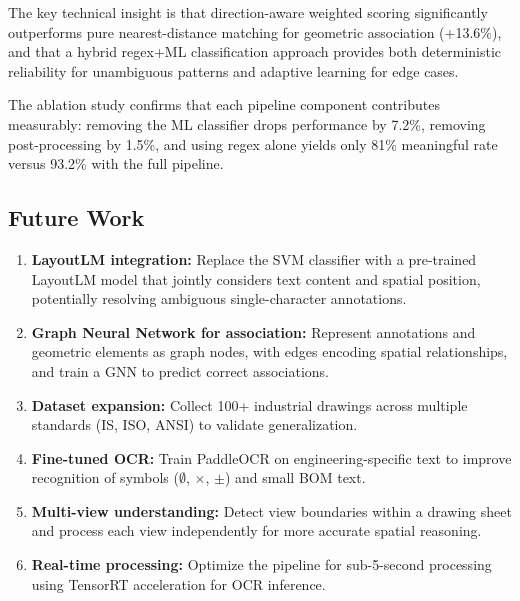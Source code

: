 \documentclass[12pt,a4paper]{article}
\begin{document}
The key technical insight is that direction-aware weighted scoring significantly outperforms pure nearest-distance matching for geometric association (+13.6\%), and that a hybrid regex+ML classification approach provides both deterministic reliability for unambiguous patterns and adaptive learning for edge cases.

The ablation study confirms that each pipeline component contributes measurably: removing the ML classifier drops performance by 7.2\%, removing post-processing by 1.5\%, and using regex alone yields only 81\% meaningful rate versus 93.2\% with the full pipeline.

\subsection{Future Work}

\begin{enumerate}
    \item \textbf{LayoutLM integration:} Replace the SVM classifier with a pre-trained LayoutLM model that jointly considers text content and spatial position, potentially resolving ambiguous single-character annotations.
    
    \item \textbf{Graph Neural Network for association:} Represent annotations and geometric elements as graph nodes, with edges encoding spatial relationships, and train a GNN to predict correct associations.
    
    \item \textbf{Dataset expansion:} Collect 100+ industrial drawings across multiple standards (IS, ISO, ANSI) to validate generalization.
    
    \item \textbf{Fine-tuned OCR:} Train PaddleOCR on engineering-specific text to improve recognition of symbols ($\emptyset$, $\times$, $\pm$) and small BOM text.
    
    \item \textbf{Multi-view understanding:} Detect view boundaries within a drawing sheet and process each view independently for more accurate spatial reasoning.
    
    \item \textbf{Real-time processing:} Optimize the pipeline for sub-5-second processing using TensorRT acceleration for OCR inference.
\end{enumerate}

\end{document}
